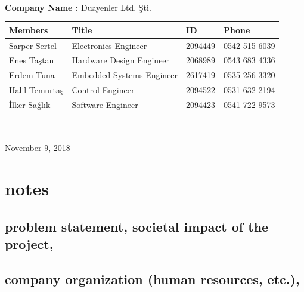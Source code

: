 \documentclass[a4paper,12pt]{article}
\begin{document}
\begin{titlepage}
\begin{minipage}[r]{0.35\textwidth}
\end{minipage}\\[1cm]
\begin{minipage}{\textwidth}
	\begin{flushleft}
		\large{\textbf{Company Name :}}	Duayenler Ltd. Şti.\\
		\begin{table}[H]
			\begin{tabular}{l l l l}
				\hline
				\textbf{Members}&\textbf{Title}& \textbf{ID}&\textbf{Phone} \\ \hline
				Sarper Sertel & Electronics Engineer& 2094449 & 0542 515 6039  \\ 
				Enes Taştan & Hardware Design Engineer & 2068989 & 0543 683 4336  \\ 
				Erdem Tuna & Embedded Systems Engineer& 2617419 & 0535 256 3320  \\ 
				Halil Temurtaş & Control Engineer& 2094522 & 0531 632 2194  \\
				İlker Sağlık & Software Engineer& 2094423 & 0541 722 9573  \\ \hline
				
				
			\end{tabular}
		\end{table}
	\end{flushleft}
\end{minipage}\\[1cm]

\begin{flushbottom}
{\large November 9, 2018} %
\end{flushbottom}

\end{titlepage}

\tableofcontents
\newpage


	\section{notes}
\subsection{problem statement, societal impact of the project,}

\subsection{company organization (human resources, etc.),}
\end{document}
